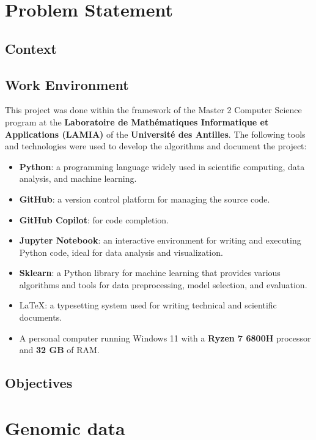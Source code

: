 \chapter{Problem Statement}
\label{chap:problem_statement}

\section{Context}
\label{sec:context}

\section{Work Environment}
\label{sec:work_environment}

This project was done within the framework of the Master 2 Computer Science program at the
\textbf{Laboratoire de Mathématiques Informatique et Applications (LAMIA)} of the \textbf{Université des Antilles}.
The following tools and technologies were used to develop the algorithms and document the project:

\begin{itemize}
	\item \textbf{Python}: a programming language widely used in scientific computing, data analysis, and machine learning.
	\item \textbf{GitHub}: a version control platform for managing the source code.
	\item \textbf{GitHub Copilot}: for code completion.
	\item \textbf{Jupyter Notebook}: an interactive environment for writing and executing Python code, ideal for data analysis and
	      visualization.
	\item \textbf{Sklearn}: a Python library for machine learning that provides various algorithms and tools for data preprocessing,
	      model selection, and evaluation.
	\item \LaTeX : a typesetting system used for writing technical and scientific documents.
	\item A personal computer running Windows 11 with a \textbf{Ryzen 7 6800H} processor and \textbf{32 GB} of RAM.
\end{itemize}

\section{Objectives}
\label{sec:objectives}

\chapter{Genomic data}
\label{chap:genomic_data}

